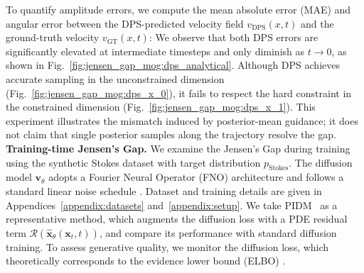 \documentclass{article}
\theoremstyle{plain}
\theoremstyle{definition}
\theoremstyle{remark}
\def\vv{{\bm{v}}}
\def\vx{{\bm{x}}}
\begin{document}
To quantify amplitude errors, we compute the mean absolute error (MAE) and angular error between the DPS-predicted velocity field $v_{\text{DPS}}(x, t)$ and the ground-truth velocity $v_{\text{GT}}(x, t)$:
We observe that both DPS errors are significantly elevated at intermediate timesteps and only diminish as $t\to0$, as shown in Fig.~\ref{fig:jensen_gap_mog:dps_analytical}. Although DPS achieves accurate sampling in the unconstrained dimension (Fig.~\ref{fig:jensen_gap_mog:dps_x_0}), it fails to respect the hard constraint in the constrained dimension (Fig.~\ref{fig:jensen_gap_mog:dps_x_1}). This experiment illustrates the mismatch induced by posterior-mean guidance; it does not claim that single posterior samples along the trajectory resolve the gap. \\
\noindent\textbf{Training-time Jensen’s Gap.}
We examine the Jensen’s Gap during training using the synthetic Stokes dataset with target distribution $p_{\text{Stokes}}$. The diffusion model $\vv_\theta$ adopts a Fourier Neural Operator (FNO) \cite{li2020fno} architecture and follows a standard linear noise schedule \cite{lipman2023flow, liu2023rectifiedflow, liu2023instaflow}. Dataset and training details are given in Appendices~\ref{appendix:datasets} and~\ref{appendix:setup}. We take PIDM~\cite{bastek2025pdim} as a representative method, which augments the diffusion loss with a PDE residual term $\mathcal R(\hat\vx_\theta(\vx_t,t))$, and compare its performance with standard diffusion training. To assess generative quality, we monitor the diffusion loss, which theoretically corresponds to the evidence lower bound (ELBO) \cite{ho2020ddpm, kingma2013vae}.
\end{document}
